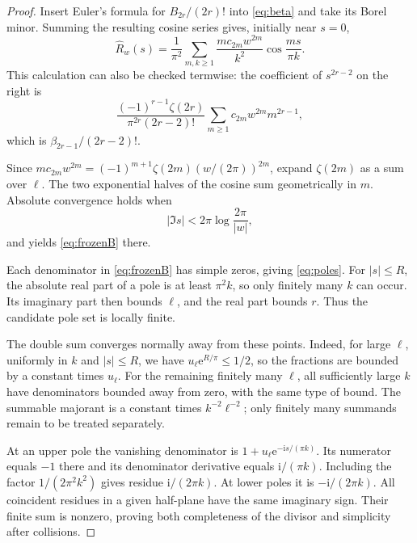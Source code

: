 \documentclass[11pt,a4paper]{article}
\numberwithin{equation}{section}
\theoremstyle{definition}
\theoremstyle{remark}
\newcommand{\ii}{\mathrm i}
\newcommand{\e}{\mathrm e}
\begin{document}
\begin{proof}
Insert Euler's formula for $B_{2r}/(2r)!$ into \eqref{eq:beta} and take its Borel minor. Summing the resulting cosine series gives, initially near $s=0$,
\begin{equation}
 \widehat R_w(s)=\frac1{\pi^2}\sum_{m,k\ge1}
       \frac{m c_{2m}w^{2m}}{k^2}
       \cos\frac{ms}{\pi k}.
 \label{eq:cosfrozen}
\end{equation}
This calculation can also be checked termwise: the coefficient of $s^{2r-2}$ on the right is
\[
 \frac{(-1)^{r-1}\zeta(2r)}{\pi^{2r}(2r-2)!}
 \sum_{m\ge1}c_{2m}w^{2m}m^{2r-1},
\]
which is $\beta_{2r-1}/(2r-2)!$.

Since $mc_{2m}w^{2m}=(-1)^{m+1}\zeta(2m)(w/(2\pi))^{2m}$, expand $\zeta(2m)$ as a sum over $\ell$. The two exponential halves of the cosine sum geometrically in $m$. Absolute convergence holds when
\[
 |\Im s|<2\pi\log\frac{2\pi}{|w|},
\]
and yields \eqref{eq:frozenB} there.

Each denominator in \eqref{eq:frozenB} has simple zeros, giving \eqref{eq:poles}. For $|s|\le R$, the absolute real part of a pole is at least $\pi^2 k$, so only finitely many $k$ can occur. Its imaginary part then bounds $\ell$, and the real part bounds $r$. Thus the candidate pole set is locally finite.

The double sum converges normally away from these points. Indeed, for large $\ell$, uniformly in $k$ and $|s|\le R$, we have $u_\ell\e^{R/\pi}\le1/2$, so the fractions are bounded by a constant times $u_\ell$. For the remaining finitely many $\ell$, all sufficiently large $k$ have denominators bounded away from zero, with the same type of bound. The summable majorant is a constant times $k^{-2}\ell^{-2}$; only finitely many summands remain to be treated separately.

At an upper pole the vanishing denominator is $1+u_\ell\e^{-\ii s/(\pi k)}$. Its numerator equals $-1$ there and its denominator derivative equals $\ii/(\pi k)$. Including the factor $1/(2\pi^2k^2)$ gives residue $\ii/(2\pi k)$. At lower poles it is $-\ii/(2\pi k)$. All coincident residues in a given half-plane have the same imaginary sign. Their finite sum is nonzero, proving both completeness of the divisor and simplicity after collisions.
\end{proof}
\end{document}
